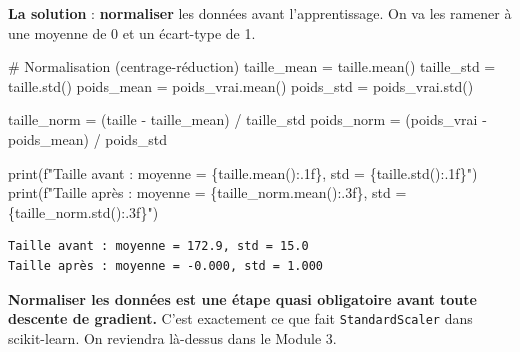 \documentclass[
  french,
  11pt,
  a4paper,
]{scrbook}
\newenvironment{Shaded}{}{}
\newcommand{\BuiltInTok}[1]{\textcolor[rgb]{0.84,0.23,0.29}{#1}}
\newcommand{\CommentTok}[1]{\textcolor[rgb]{0.42,0.45,0.49}{#1}}
\newcommand{\NormalTok}[1]{\textcolor[rgb]{0.14,0.16,0.18}{#1}}
\newcommand{\OperatorTok}[1]{\textcolor[rgb]{0.14,0.16,0.18}{#1}}
\newcommand{\SpecialCharTok}[1]{\textcolor[rgb]{0.00,0.36,0.77}{#1}}
\newcommand{\SpecialStringTok}[1]{\textcolor[rgb]{0.01,0.18,0.38}{#1}}
\begin{document}
\textbf{La solution} : \textbf{normaliser} les données avant
l'apprentissage. On va les ramener à une moyenne de 0 et un écart-type
de 1.

\begin{Shaded}
\begin{Highlighting}[]
\CommentTok{\# Normalisation (centrage{-}réduction)}
\NormalTok{taille\_mean }\OperatorTok{=}\NormalTok{ taille.mean()}
\NormalTok{taille\_std }\OperatorTok{=}\NormalTok{ taille.std()}
\NormalTok{poids\_mean }\OperatorTok{=}\NormalTok{ poids\_vrai.mean()}
\NormalTok{poids\_std }\OperatorTok{=}\NormalTok{ poids\_vrai.std()}

\NormalTok{taille\_norm }\OperatorTok{=}\NormalTok{ (taille }\OperatorTok{{-}}\NormalTok{ taille\_mean) }\OperatorTok{/}\NormalTok{ taille\_std}
\NormalTok{poids\_norm }\OperatorTok{=}\NormalTok{ (poids\_vrai }\OperatorTok{{-}}\NormalTok{ poids\_mean) }\OperatorTok{/}\NormalTok{ poids\_std}

\BuiltInTok{print}\NormalTok{(}\SpecialStringTok{f"Taille avant : moyenne = }\SpecialCharTok{\{}\NormalTok{taille}\SpecialCharTok{.}\NormalTok{mean()}\SpecialCharTok{:.1f\}}\SpecialStringTok{, std = }\SpecialCharTok{\{}\NormalTok{taille}\SpecialCharTok{.}\NormalTok{std()}\SpecialCharTok{:.1f\}}\SpecialStringTok{"}\NormalTok{)}
\BuiltInTok{print}\NormalTok{(}\SpecialStringTok{f"Taille après : moyenne = }\SpecialCharTok{\{}\NormalTok{taille\_norm}\SpecialCharTok{.}\NormalTok{mean()}\SpecialCharTok{:.3f\}}\SpecialStringTok{, std = }\SpecialCharTok{\{}\NormalTok{taille\_norm}\SpecialCharTok{.}\NormalTok{std()}\SpecialCharTok{:.3f\}}\SpecialStringTok{"}\NormalTok{)}
\end{Highlighting}
\end{Shaded}

\begin{verbatim}
Taille avant : moyenne = 172.9, std = 15.0
Taille après : moyenne = -0.000, std = 1.000
\end{verbatim}

\begin{tcolorbox}[enhanced jigsaw, arc=.35mm, bottomrule=.15mm, bottomtitle=1mm, breakable, colback=white, colbacktitle=quarto-callout-tip-color!10!white, colframe=quarto-callout-tip-color-frame, coltitle=black, left=2mm, leftrule=.75mm, opacityback=0, opacitybacktitle=0.6, rightrule=.15mm, title=\textcolor{quarto-callout-tip-color}{\faLightbulb}\hspace{0.5em}{🧠 À retenir}, titlerule=0mm, toprule=.15mm, toptitle=1mm]

\textbf{Normaliser les données est une étape quasi obligatoire avant
toute descente de gradient.} C'est exactement ce que fait
\texttt{StandardScaler} dans scikit-learn. On reviendra là-dessus dans
le Module 3.

\end{tcolorbox}
\end{document}
